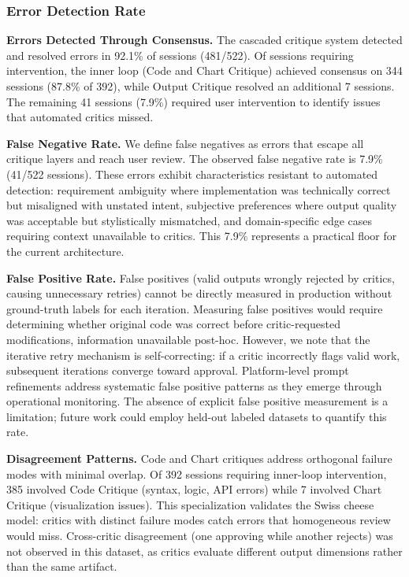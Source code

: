 \documentclass[sigconf]{acmart}
\begin{document}
\subsubsection{Error Detection Rate}

\textbf{Errors Detected Through Consensus.} The cascaded critique system detected and resolved errors in 92.1\% of sessions (481/522). Of sessions requiring intervention, the inner loop (Code and Chart Critique) achieved consensus on 344 sessions (87.8\% of 392), while Output Critique resolved an additional 7 sessions. The remaining 41 sessions (7.9\%) required user intervention to identify issues that automated critics missed.

\textbf{False Negative Rate.} We define false negatives as errors that escape all critique layers and reach user review. The observed false negative rate is 7.9\% (41/522 sessions). These errors exhibit characteristics resistant to automated detection: requirement ambiguity where implementation was technically correct but misaligned with unstated intent, subjective preferences where output quality was acceptable but stylistically mismatched, and domain-specific edge cases requiring context unavailable to critics. This 7.9\% represents a practical floor for the current architecture.

\textbf{False Positive Rate.} False positives (valid outputs wrongly rejected by critics, causing unnecessary retries) cannot be directly measured in production without ground-truth labels for each iteration. Measuring false positives would require determining whether original code was correct before critic-requested modifications, information unavailable post-hoc. However, we note that the iterative retry mechanism is self-correcting: if a critic incorrectly flags valid work, subsequent iterations converge toward approval. Platform-level prompt refinements address systematic false positive patterns as they emerge through operational monitoring. The absence of explicit false positive measurement is a limitation; future work could employ held-out labeled datasets to quantify this rate.

\textbf{Disagreement Patterns.} Code and Chart critiques address orthogonal failure modes with minimal overlap. Of 392 sessions requiring inner-loop intervention, 385 involved Code Critique (syntax, logic, API errors) while 7 involved Chart Critique (visualization issues). This specialization validates the Swiss cheese model: critics with distinct failure modes catch errors that homogeneous review would miss. Cross-critic disagreement (one approving while another rejects) was not observed in this dataset, as critics evaluate different output dimensions rather than the same artifact.
\end{document}
